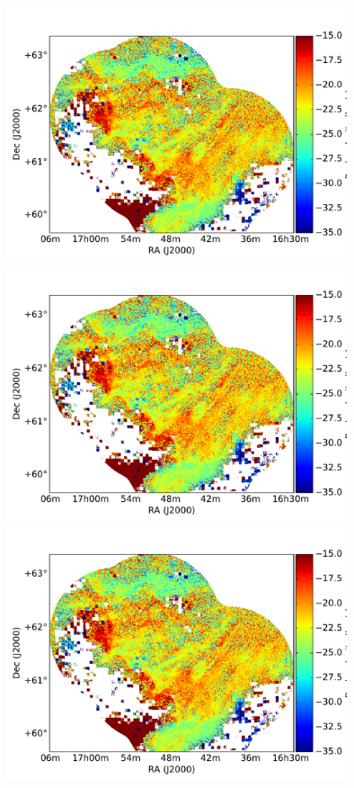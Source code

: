 \documentclass[traditabstract]{aa}
\begin{document}
\begin{figure}[h]
  \centering
  \includegraphics[page=1,height=7.5cm,trim=110 35 105 75,clip=true]{Figures/DHIGLS_velo.pdf}
  \hspace{5mm}
  \includegraphics[page=4,height=7.5cm,trim=110 35 105 75,clip=true]{Figures/DHIGLS_velo.pdf} \\
  \vspace{5mm}
  \includegraphics[page=2,height=7.5cm,trim=110 35 105 75,clip=true]{Figures/DHIGLS_velo.pdf}

\end{figure}
\end{document}
